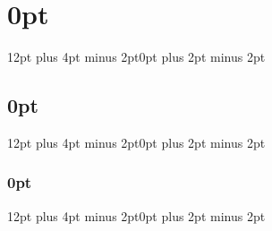\documentclass{article}
\begin{document}
\renewcommand{\doiprefix}{}
    \newcommand{\doi}[1]{https://doi.org/#1}

\titlespacing\section{0pt}{12pt plus 4pt minus 2pt}{0pt plus 2pt minus 2pt}
\titlespacing\subsection{0pt}{12pt plus 4pt minus 2pt}{0pt plus 2pt minus 2pt}
\titlespacing\subsubsection{0pt}{12pt plus 4pt minus 2pt}{0pt plus 2pt minus 2pt}
    
\newcommand{\thetitle}{
Title of your work
}
\newcommand{\thesubtitle}{
Subtitle if needed
}
\newcommand{\theauthor}{
First-Name Surname
} %

\usepackage{fancyhdr}
\pagestyle{fancy}
\fancyhf{} %
\fancyheadoffset{0cm}
\renewcommand{\headrulewidth}{0pt} 
\renewcommand{\footrulewidth}{0pt}
\end{document}
